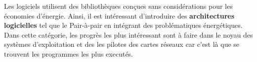 
Les logiciels utilisent des bibliothèques conçues sans considérations pour les
économies d'énergie.  Ainsi, il est intéressant d'introduire des
\textbf{architectures logicielles} tel que le Pair-à-pair en intégrant des
problématiques énergétiques.  Dans cette catégorie, les progrès les plus
intéressant sont à faire dans le noyau des systèmes d'exploitation et des les
pilotes des cartes réseaux car c'est là que se trouvent les programmes les plus
executés.
